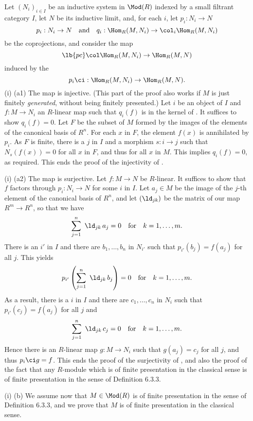 \documentclass[12pt]{article}
\theoremstyle{remark}
\theoremstyle{definition}
\begin{document}
Let $(N_i)_{i\in I}$ be an inductive system in $\Mod(R)$ indexed by a small filtrant category $I$, let $N$ be its inductive limit, and, for each $i$, let $p_i:N_i\to N$ 
$$
p_i:N_i\to N\quad\text{and}\quad q_i:\Hom_R(M,N_i)\to\col_i\Hom_R(M,N_i)
$$ 
be the coprojections, and consider the map
\begin{equation}\lb{pc}
\col\Hom_R(M,N_i)\to\Hom_R(M,N)
\end{equation}  
induced by the 
$$
p_i\ci:\Hom_R(M,N_i)\to\Hom_R(M,N).
$$ 
(i) (a1) The map  is injective. (This part of the proof also works if $M$ is just finitely \emph{generated}, without being finitely presented.) Let $i$ be an object of $I$ and $f:M\to N_i$ an $R$-linear map such that $q_i(f)$ is in the kernel of . It suffices to show $q_i(f)=0$. Let $F$ be the subset of $M$ formed by the images of the elements of the canonical basis of $R^n$. For each $x$ in $F$, the element $f(x)$ is annihilated by $p_i$. As $F$ is finite, there is a $j$ in $I$ and a morphism $s:i\to j$ such that $N_s(f(x))=0$ for all $x$ in $F$, and thus for all $x$ in $M$. This implies $q_i(f)=0$, as required. This ends the proof of the injectivity of .

\nn(i) (a2) The map  is surjective. Let $f:M\to N$ be $R$-linear. It suffices to show that $f$ factors through $p_i:N_i\to N$ for some $i$ in $I$. Let $a_j\in M$ be the image of the $j$-th element of the canonical basis of $R^n$, and let $(\ld_{jk})$ be the matrix of our map $R^m\to R^n$, so that we have 
$$
\sum_{j=1}^n\ \ld_{jk}\,a_j=0\quad\text{for}\quad k=1,\dots,m.
$$ 
There is an $i'$ in $I$ and there are $b_1,\dots,b_n$ in $N_{i'}$ such that $p_{i'}(b_j)=f(a_j)$ for all $j$. This yields 
$$
p_{i'}\left(\sum_{j=1}^n\ \ld_{jk}\,b_j\right)=0\quad\text{for}\quad k=1,\dots,m.
$$ 
As a result, there is a $i$ in $I$ and there are $c_1,\dots,c_n$ in $N_i$ such that $p_{i'}(c_j)=f(a_j)$ for all $j$ and 
$$
\sum_{j=1}^n\ \ld_{jk}\,c_j=0\quad\text{for}\quad k=1,\dots,m.
$$ 
Hence there is an $R$-linear map $g:M\to N_i$ such that $g(a_j)=c_j$ for all $j$, and thus $p_i\ci g=f$. This ends the proof of the surjectivity of , and also the proof of the fact that any $R$-module which is of finite presentation in the classical sense is of finite presentation in the sense of Definition 6.3.3. 

\nn(i) (b) We assume now that $M\in\Mod(R)$ is of finite presentation in the sense of Definition 6.3.3, and we prove that $M$ is of finite presentation in the classical sense.
\end{document}
